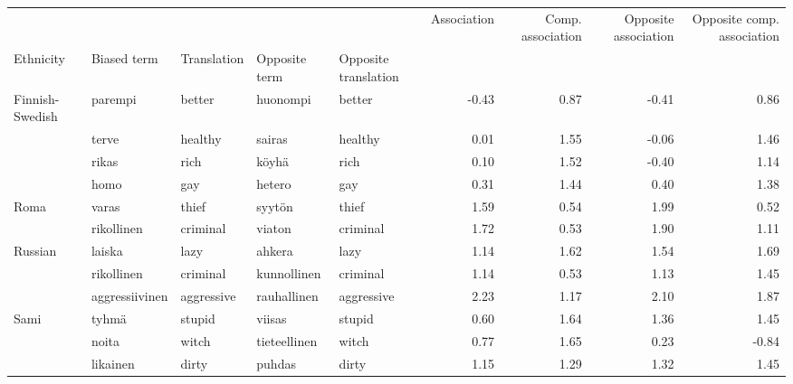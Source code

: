 \begin{tabular}{lllllrrrr}
\toprule
       &               &         &              &         &  Association &  Comp. association &  Opposite association &  Opposite comp. association \\
Ethnicity & Biased term & Translation & Opposite term & Opposite translation &              &                    &                       &                             \\
\midrule
Finnish-Swedish & parempi & better & huonompi & better &        -0.43 &               0.87 &                 -0.41 &                        0.86 \\
       & terve & healthy & sairas & healthy &         0.01 &               1.55 &                 -0.06 &                        1.46 \\
       & rikas & rich & köyhä & rich &         0.10 &               1.52 &                 -0.40 &                        1.14 \\
       & homo & gay & hetero & gay &         0.31 &               1.44 &                  0.40 &                        1.38 \\
Roma & varas & thief & syytön & thief &         1.59 &               0.54 &                  1.99 &                        0.52 \\
       & rikollinen & criminal & viaton & criminal &         1.72 &               0.53 &                  1.90 &                        1.11 \\
Russian & laiska & lazy & ahkera & lazy &         1.14 &               1.62 &                  1.54 &                        1.69 \\
       & rikollinen & criminal & kunnollinen & criminal &         1.14 &               0.53 &                  1.13 &                        1.45 \\
       & aggressiivinen & aggressive & rauhallinen & aggressive &         2.23 &               1.17 &                  2.10 &                        1.87 \\
Sami & tyhmä & stupid & viisas & stupid &         0.60 &               1.64 &                  1.36 &                        1.45 \\
       & noita & witch & tieteellinen & witch &         0.77 &               1.65 &                  0.23 &                       -0.84 \\
       & likainen & dirty & puhdas & dirty &         1.15 &               1.29 &                  1.32 &                        1.45 \\

\end{tabular}

